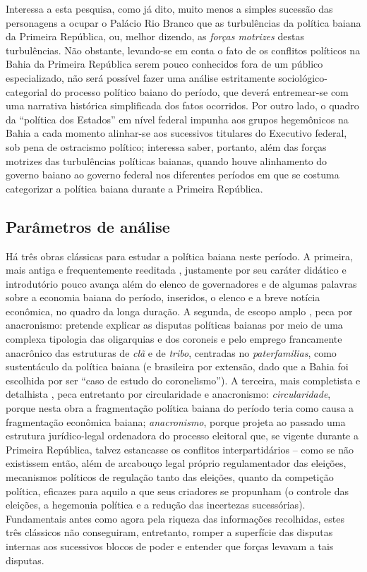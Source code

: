 Interessa a esta pesquisa, como já dito, muito menos a simples sucessão das personagens a ocupar o Palácio Rio Branco que as turbulências da política baiana da Primeira República, ou, melhor dizendo, as \textit{forças motrizes} destas turbulências. Não obstante, levando-se em conta o fato de os conflitos políticos na Bahia da Primeira República serem pouco conhecidos fora de um público especializado, não será possível fazer uma análise estritamente sociológico-categorial do processo político baiano do período, que deverá entremear-se com uma narrativa histórica simplificada dos fatos ocorridos. Por outro lado, o quadro da ``política dos Estados'' em nível federal impunha aos grupos hegemônicos na Bahia a cada momento alinhar-se aos sucessivos titulares do Executivo federal, sob pena de ostracismo político; interessa saber, portanto, além das forças motrizes das turbulências políticas baianas, quando houve alinhamento do governo baiano ao governo federal nos diferentes períodos em que se costuma categorizar a política baiana durante a Primeira República.

\subsection{Parâmetros de análise}

Há três obras clássicas para estudar a política baiana neste período. A primeira, mais antiga e frequentemente reeditada \cite{TAVARES2008}, justamente por seu caráter didático e introdutório pouco avança além do elenco de governadores e de algumas palavras sobre a economia baiana do período, inseridos, o elenco e a breve notícia econômica, no quadro da longa duração. A segunda, de escopo amplo \cite{pang_coronelismo_1979}, peca por anacronismo: pretende explicar as disputas políticas baianas por meio de uma complexa tipologia das oligarquias e dos coroneis e pelo emprego francamente anacrônico das estruturas de \textit{clã} e de \textit{tribo}, centradas no \textit{paterfamilias}, como sustentáculo da política baiana (e brasileira por extensão, dado que a Bahia foi escolhida por ser ``caso de estudo do coronelismo''). A terceira, mais completista e detalhista \cite{sampaio_partidos_1978}, peca entretanto por circularidade e anacronismo: \textit{circularidade}, porque nesta obra a fragmentação política baiana do período teria como causa a fragmentação econômica baiana; \textit{anacronismo}, porque projeta ao passado uma estrutura jurídico-legal ordenadora do processo eleitoral que, se vigente durante a Primeira República, talvez estancasse os conflitos interpartidários -- como se não existissem então, além de arcabouço legal próprio regulamentador das eleições, mecanismos políticos de regulação tanto das eleições, quanto da competição política, eficazes para aquilo a que seus criadores se propunham (o controle das eleições, a hegemonia política e a redução das incertezas sucessórias). Fundamentais antes como agora pela riqueza das informações recolhidas, estes três clássicos não conseguiram, entretanto, romper a superfície das disputas internas aos sucessivos blocos de poder e entender que forças levavam a tais disputas. 

